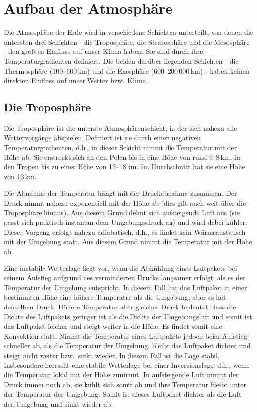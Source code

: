 \section{Aufbau der Atmosph\"are}

Die Atmosph\"are der Erde wird in verschiedene Schichten unterteilt, von denen die untersten
drei Schichten - die Troposph\"are, die Stratosph\"are und die Mesosph\"are - den gr\"o\ss ten
Einfluss auf unser Klima haben. Sie sind durch ihre Temperaturgradienten definiert. Die beiden
dar\"uber liegenden Schichten - die Thermosph\"are (100--600\,km) und die Exosph\"are
(600--200\,000\,km) - haben keinen direkten Einfluss auf unser Wetter bzw.\ Klima. 

\subsection{Die Troposph\"are}

Die Troposph\"are ist die unterste Atmosph\"arenschicht, in der sich nahezu alle Wettervorg\"ange
abspielen. Definiert ist sie durch einen negativen Temperaturgradienten, d.h., in dieser Schicht
nimmt die Temperatur mit der H\"ohe ab. Sie erstreckt sich an den Polen bis in eine H\"ohe von
rund 6--8\,km, in den Tropen bis zu einer H\"ohe von 12--18\,km. Im Durchschnitt hat sie eine
H\"ohe von 13\,km. 

Die Abnahme der Temperatur h\"angt mit der Druckabnahme zusammen. Der Druck nimmt
nahezu exponentiell mit der H\"ohe ab (dies gilt auch weit \"uber die Troposph\"are hinaus). Aus diesem
Grund dehnt sich aufsteigende Luft aus
(sie passt sich praktisch instantan dem Umgebungsdruck an) und wird dabei k\"uhler. Dieser
Vorgang erfolgt nahezu adiabatisch, d.h., es findet kein W\"armeaustausch mit der Umgebung
statt. Aus diesem Grund nimmt die Temperatur mit der H\"ohe ab. 

Eine instabile Wetterlage liegt
vor, wenn die Abk\"uhlung eines Luftpakets bei seinem Aufstieg aufgrund des verminderten
Drucks langsamer erfolgt, als es der Temperatur der Umgebung entspricht. In diesem Fall hat
das Luftpaket in einer bestimmten H\"ohe eine h\"ohere Temperatur als die Umgebung, aber
es hat denselben Druck. H\"ohere Temperatur aber gleicher Druck bedeutet, dass die Dichte
des Luftpakets geringer ist als die Dichte der Umgebungsluft und somit ist das Luftpaket leicher
und steigt weiter in die H\"ohe. Es findet somit eine Konvektion statt. Nimmt die Temperatur eines
Luftpakets jedoch beim Aufstieg schneller ab, als die Temperatur der Umgebung, bleibt das
Luftpaket dichter und steigt nicht weiter bzw.\ sinkt wieder. In diesem Fall ist die Lage stabil.
Insbesondere herrscht eine stabile Wetterlage bei einer Inversionslage, d.h., wenn die
Temperatur lokal mit der H\"ohe zunimmt. In aufsteigende Luft nimmt der Druck immer noch
ab, sie k\"uhlt sich somit ab und ihre Temperatur bleibt unter der Temperatur der Umgebung.
Somit ist dieses Luftpaket dichter als die Luft der Umgebung und sinkt wieder ab.   

